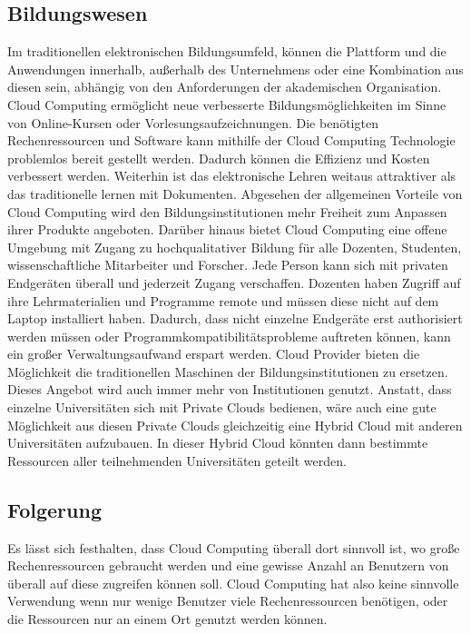 \subsection{Bildungswesen}
Im traditionellen elektronischen Bildungsumfeld, können die Plattform und die Anwendungen innerhalb, außerhalb des Unternehmens oder eine Kombination aus diesen sein, abhängig von den Anforderungen der akademischen Organisation\cite{teaching}. Cloud Computing ermöglicht neue verbesserte Bildungsmöglichkeiten im Sinne von Online-Kursen oder Vorlesungsaufzeichnungen. Die benötigten Rechenressourcen und Software kann mithilfe der Cloud Computing Technologie problemlos bereit gestellt werden. Dadurch können die Effizienz und Kosten verbessert werden. Weiterhin ist das elektronische Lehren weitaus attraktiver als das traditionelle lernen mit Dokumenten\cite{teaching}.
Abgesehen der allgemeinen Vorteile von Cloud Computing wird den Bildungsinstitutionen mehr Freiheit zum Anpassen ihrer Produkte angeboten. Darüber hinaus bietet Cloud Computing eine offene Umgebung mit Zugang zu hochqualitativer Bildung für alle Dozenten, Studenten, wissenschaftliche Mitarbeiter und Forscher. Jede Person kann sich mit privaten Endgeräten überall und jederzeit Zugang verschaffen. Dozenten haben Zugriff auf ihre Lehrmaterialien und Programme remote und müssen diese nicht auf dem Laptop installiert haben. Dadurch, dass nicht einzelne Endgeräte erst authorisiert werden müssen oder Programmkompatibilitätsprobleme auftreten können, kann ein großer Verwaltungsaufwand erspart werden. Cloud Provider bieten die Möglichkeit die traditionellen Maschinen der Bildungsinstitutionen zu ersetzen. Dieses Angebot wird auch immer mehr von Institutionen genutzt. Anstatt, dass einzelne Universitäten sich mit Private Clouds bedienen, wäre auch eine gute Möglichkeit aus diesen Private Clouds gleichzeitig eine Hybrid Cloud mit anderen Universitäten aufzubauen. In dieser Hybrid Cloud könnten dann bestimmte Ressourcen aller teilnehmenden Universitäten geteilt werden\cite{recenttrends}.

\subsection{Folgerung}
Es lässt sich festhalten, dass Cloud Computing überall dort sinnvoll ist, wo große Rechenressourcen gebraucht werden und eine gewisse Anzahl an Benutzern von überall auf diese zugreifen können soll. Cloud Computing hat also keine sinnvolle Verwendung wenn nur wenige Benutzer viele Rechenressourcen benötigen, oder die Ressourcen nur an einem Ort genutzt werden  können.